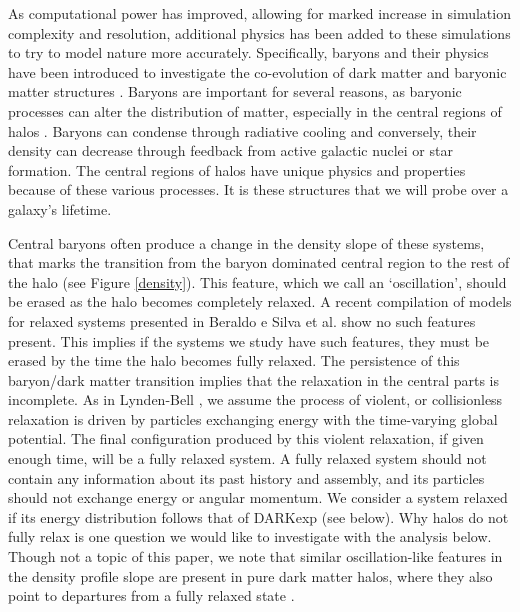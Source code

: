 \documentclass[a4paper,11pt]{article}
\begin{document}
As computational power has improved, allowing for marked increase in simulation complexity and resolution, additional physics has been added to these simulations to try to model nature more accurately.
Specifically, baryons and their physics have been introduced to investigate the co-evolution of dark matter and baryonic matter 
structures \citep{Gne04,Ped09,Duf10,Bro12,Saw13,Cus14,DiC14,Vel14,Saw15,Sch15a}.  Baryons are important for several reasons, as baryonic processes can alter 
the distribution of matter, especially in the central regions of halos \citep{Nav96,Gne02,Rea05,Mas08,Pon12,Tey13,Nip15,Ono15,Rea16}.  Baryons can condense 
through radiative cooling and conversely, their density can decrease through feedback from active galactic nuclei or 
star formation.  The central regions of halos have unique physics and properties \citep{Xu17} because of these various processes.   It is these structures 
that we will probe over a galaxy's lifetime.

Central baryons often produce a change in the density slope 
of these systems, that marks the transition from the baryon dominated central region to the rest of the halo (see Figure \ref{density}).  This feature, 
which we call an `oscillation', should be erased as the halo becomes completely relaxed.  A recent compilation of models for relaxed systems presented 
in Beraldo e Silva et al. \citep{Ber13} show no such features present.  This implies if the systems we study have such features, they must 
be erased by the time the halo becomes fully relaxed.  The persistence of this baryon/dark matter transition implies that the relaxation in the central parts is incomplete.  As 
in Lynden-Bell \citep{Lyn67}, we assume the process of violent, or collisionless relaxation 
is driven by particles exchanging energy with the time-varying global potential.  The final configuration produced by this violent relaxation, if given enough time, will be a fully 
relaxed system.  A fully relaxed system should not contain any information about its past history and assembly, and its particles should not exchange 
energy or angular momentum.  We consider a system relaxed if its energy distribution follows that of DARKexp (see below).  Why halos do not fully relax is 
one question we would like to investigate with the analysis below.  Though not a topic of this paper, we note that similar oscillation-like features in the 
density profile slope are present in pure dark matter halos, where they also point to departures from a fully relaxed state \citep{You16}.
\end{document}
